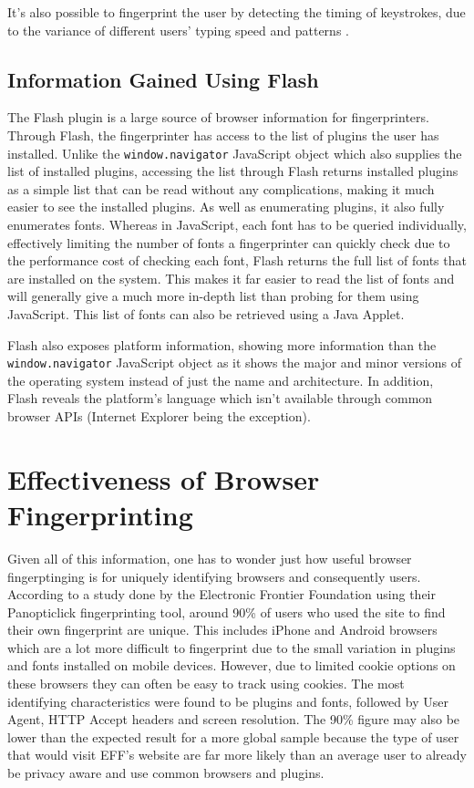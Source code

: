 It's also possible to fingerprint the user by detecting the timing of keystrokes, due to the variance of different users' typing speed and patterns \citep{keystrokes}.

\subsection{Information Gained Using Flash}

The Flash plugin is a large source of browser information for fingerprinters.
Through Flash, the fingerprinter has access to the list of plugins the user has installed.
Unlike the \texttt{window.navigator} JavaScript object which also supplies the list of installed plugins, accessing the list through Flash returns installed plugins as a simple list that can be read without any complications, making it much easier to see the installed plugins.
As well as enumerating plugins, it also fully enumerates fonts.
Whereas in JavaScript, each font has to be queried individually, effectively limiting the number of fonts a fingerprinter can quickly check due to the performance cost of checking each font, Flash returns the full list of fonts that are installed on the system.
This makes it far easier to read the list of fonts and will generally give a much more in-depth list than probing for them using JavaScript.
This list of fonts can also be retrieved using a Java Applet.

Flash also exposes platform information, showing more information than the \texttt{window.navigator} JavaScript object as it shows the major and minor versions of the operating system instead of just the name and architecture.
In addition, Flash reveals the platform's language which isn't available through common browser APIs (Internet Explorer being the exception).

\section{Effectiveness of Browser Fingerprinting}

Given all of this information, one has to wonder just how useful browser fingerptinging is for uniquely identifying browsers and consequently users.
According to a study done by the Electronic Frontier Foundation \citep{browser-uniqueness} using their Panopticlick fingerprinting tool, around 90\% of users who used the site to find their own fingerprint are unique.
This includes iPhone and Android browsers which are a lot more difficult to fingerprint due to the small variation in plugins and fonts installed on mobile devices.
However, due to limited cookie options on these browsers they can often be easy to track using cookies.
The most identifying characteristics were found to be plugins and fonts, followed by User Agent, HTTP Accept headers and screen resolution.
The 90\% figure may also be lower than the expected result for a more global sample because the type of user that would visit EFF's website are far more likely than an average user to already be privacy aware and use common browsers and plugins.

